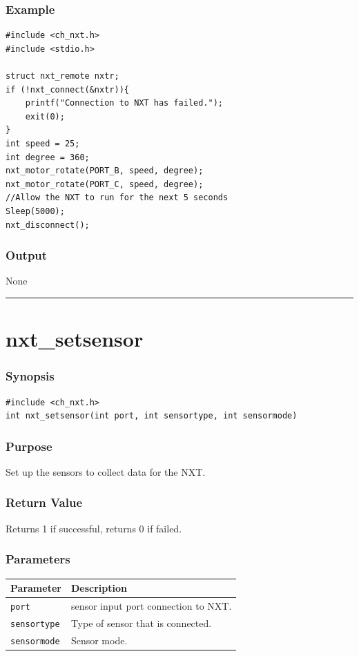 \documentclass[12pt]{article}
\begin{document}
\subsubsection*{Example}
\begin{verbatim}
#include <ch_nxt.h> 
#include <stdio.h>

struct nxt_remote nxtr;
if (!nxt_connect(&nxtr)){
    printf("Connection to NXT has failed.");
    exit(0);
}
int speed = 25;
int degree = 360;
nxt_motor_rotate(PORT_B, speed, degree);
nxt_motor_rotate(PORT_C, speed, degree);
//Allow the NXT to run for the next 5 seconds
Sleep(5000);    
nxt_disconnect();  
\end{verbatim}

\subsubsection*{Output}
None 
\\

\hrule
\newpage

\section*{nxt\_setsensor}

\subsubsection*{Synopsis}
\begin{verbatim}
#include <ch_nxt.h>
int nxt_setsensor(int port, int sensortype, int sensormode)
\end{verbatim}

\subsubsection*{Purpose}
Set up the sensors to collect data for the NXT.

\subsubsection*{Return Value}
Returns 1 if successful, returns 0 if failed.

\subsubsection*{Parameters}
\begin{tabular}{ l | p{12cm} }
Parameter			& Description\\ \hline
\verb+port+			& sensor input port connection to NXT.\\
\verb+sensortype+	& Type of sensor that is connected.\\
\verb+sensormode+	& Sensor mode.
\end{tabular}
\end{document}
